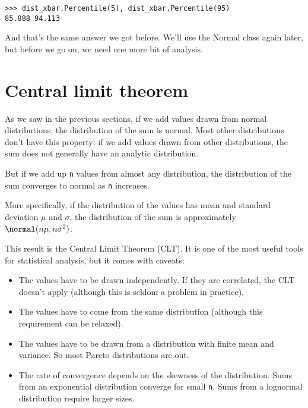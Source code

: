 \documentclass[12pt]{book}
\begin{document}
\begin{verbatim}
>>> dist_xbar.Percentile(5), dist_xbar.Percentile(95)
85.888 94.113
\end{verbatim}

And that's the same answer we got before.  We'll use the Normal
class again later, but before we go on, we need one more bit of
analysis.


\section{Central limit theorem}
\label{CLT}

As we saw in the previous sections, if we add values drawn from normal
distributions, the distribution of the sum is normal.
Most other distributions don't have this property;
if we add values drawn from other distributions, the sum does not
generally have an analytic distribution.
 
 

But if we add up {\tt n} values from
almost any distribution, the distribution of the sum converges to
normal as {\tt n} increases.

More specifically, if the distribution of the values has mean and
standard deviation $\mu$ and $\sigma$, the distribution of the sum is
approximately $\normal(n \mu, n \sigma^2)$.

This result is the Central Limit Theorem (CLT).  It is one of the
most useful tools for statistical analysis, but it comes with
caveats:

\begin{itemize}

\item The values have to be drawn independently.  If they are
correlated, the CLT doesn't apply (although this is seldom a problem
in practice).

\item The values have to come from the same distribution (although
  this requirement can be relaxed).

\item The values have to be drawn
  from a distribution with finite mean and variance.  So most Pareto
  distributions are out.

\item The rate of convergence depends
  on the skewness of the distribution.  Sums from an exponential
  distribution converge for small {\tt n}.  Sums from a
  lognormal distribution require larger sizes.

\end{itemize}
\end{document}
